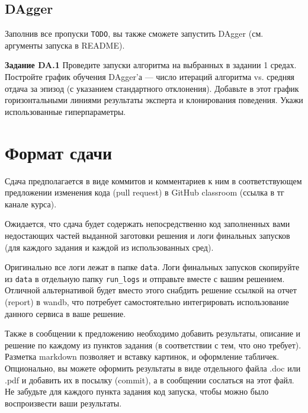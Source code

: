 \documentclass[12pt, oneside]{article}
\begin{document}
\subsection{DAgger}

Заполнив все пропуски \verb|TODO|, вы также сможете запустить DAgger (см. аргументы запуска в README).

\textbf{Задание DA.1} Проведите запуски алгоритма на выбранных в задании 1 средах. Постройте график обучения DAgger'а --- число итераций алгоритма vs. средняя отдача за эпизод (с указанием стандартного отклонения). Добавьте в этот график горизонтальными линиями результаты эксперта и клонирования поведения. Укажи использованные гиперпараметры.

\section{Формат сдачи}

Сдача предполагается в виде коммитов и комментариев к ним в соответствующем предложении изменения кода (pull request) в GitHub classroom (ссылка в тг канале курса).

Ожидается, что сдача будет содержать непосредственно код заполненных вами недостающих частей выданной заготовки решения и логи финальных запусков (для каждого задания и каждой из использованных сред).

Оригинально все логи лежат в папке \verb|data|. Логи финальных запусков скопируйте из \verb|data| в отдельную папку \verb|run_logs| и отправьте вместе с вашим решением. Отличной альтернативой будет вместо этого снабдить решение ссылкой на отчет (report) в wandb, что потребует самостоятельно интегрировать использование данного сервиса в ваше решение.

Также в сообщении к предложению необходимо добавить результаты, описание и решение по каждому из пунктов задания (в соответствии с тем, что оно требует). Разметка markdown позволяет и вставку картинок, и оформление табличек. Опционально, вы можете оформить результаты в виде отдельного файла .doc или .pdf и добавить их в посылку (commit), а в сообщении сослаться на этот файл. Не забудьте для каждого пункта задания код запуска, чтобы можно было воспроизвести ваши результаты.
\end{document}
